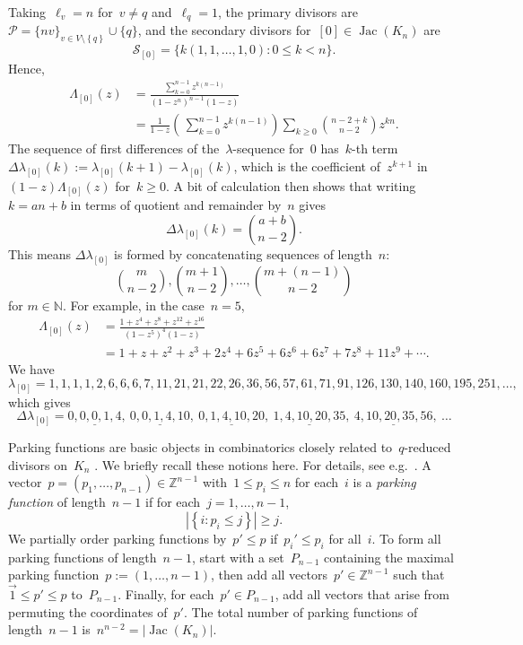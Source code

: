 \documentclass{amsart}
\DeclareMathOperator{\Jac}{Jac}
\newcommand{\primary}{\mathcal{P}}
\newcommand{\secondary}{\mathcal{S}}
\newcommand{\Z}{\mathbb{Z}}
\newcommand{\N}{\mathbb{N}}
\newcommand{\tl}{\ell}
\begin{document}
Taking~$\tl_v=n$ for~$v\neq q$
and~$\tl_q=1$, the primary divisors are~$\primary=\{nv\}_{v\in V\setminus\left\{
q \right\}}\cup\{q\}$, and the secondary divisors for~$[0]\in\Jac(K_n)$ are
\[
  \secondary_{[0]}=\{k(1,1,\dots,1,0): 0\leq k<n\}.
\]
Hence,
\begin{align*}
  \Lambda_{[0]}(z)
  &= \frac{\sum_{k=0}^{n-1}z^{k(n-1)}}{(1-z^n)^{n-1}(1-z)}\\[8pt]
  &=\frac{1}{1-z}\left(\,\sum_{k=0}^{n-1}z^{k(n-1)}\right)\sum_{k\geq
  0}\binom{n-2+k}{n-2}z^{kn}.
\end{align*}
The sequence of first differences of the~$\lambda$-sequence for~$0$
has~$k$-th term~$\Delta\lambda_{[0]}(k):=\lambda_{[0]}(k+1)-\lambda_{[0]}(k)$,
which is the coefficient of~$z^{k+1}$ in~$(1-z)\Lambda_{[0]}(z)$ for~$k\geq0$.  
A bit of calculation then shows that writing~$k=an+b$ in terms of quotient and
remainder by~$n$ gives
\[
 \Delta\lambda_{[0]}(k)=\binom{a+b}{n-2}.
\]
This means $\Delta\lambda_{[0]}$ is formed by concatenating sequences of length~$n$:
\[
  \binom{m}{n-2},\binom{m+1}{n-2},\dots,\binom{m+(n-1)}{n-2}  
\]
for $m\in\N$.
For example, in the case~$n=5$, 
\begin{align*}
  \Lambda_{[0]}(z)&=\frac{1+z^4+z^{8}+z^{12}+z^{16}}{(1-z^5)^4(1-z)}\\[8pt]
  &=
1+z+z^{2}+z^{3}+2z^{4}+6z^{5}+6z^{6}+6z^{7}+7z^{8}+11z^{9}+\cdots.
\end{align*}
We have
\[
  \lambda_{[0]}=
  1, 1, 1, 1, 2, 6, 6, 6, 7, 11, 21, 21, 22, 26, 36, 56, 57, 61, 71, 91, 126,
  130, 140, 160, 195, 251, \dots,
\]
which gives
\[
\Delta\lambda_{[0]}=
\underline{0, 0, 0, 1, 4},\ \underline{0, 0, 1, 4, 10},\ \underline{0, 1, 4, 10,
20},\ \underline{1, 4, 10, 20, 35},\ \underline{4, 10, 20, 35, 56},\ \dots
\]

 Parking functions are basic objects in
combinatorics closely related to~$q$-reduced divisors on~$K_n$ .  We briefly
recall these notions here. For details, see e.g.~\cite[Chapter~11]{Corry}.  A
vector~$p=(p_1,\dots,p_{n-1})\in\Z^{n-1}$ with~$1\leq p_i\leq n$ for each~$i$ is
a {\em parking function} of length~$n-1$ if for each~$j=1,\dots,n-1$,
\[
  |\left\{ i:p_i\leq j \right\}|\geq j.
\]
We partially order parking functions by~$p'\leq p$ if~$p_i'\leq p_i$ for
all~$i$.  To form all parking functions of length~$n-1$, start
with a set~$P_{n-1}$ containing the maximal parking
function~$p:=(1,\dots,n-1)$, then add all
vectors~$p'\in\Z^{n-1}$ such that~$\vec{1}\leq p'\leq p$ to~$P_{n-1}$. Finally, 
for each~$p'\in P_{n-1}$, add all vectors that arise from permuting the
coordinates of~$p'$.  The total number of parking functions of length~$n-1$
is~$n^{n-2}=|\Jac(K_n)|$.  
\end{document}
